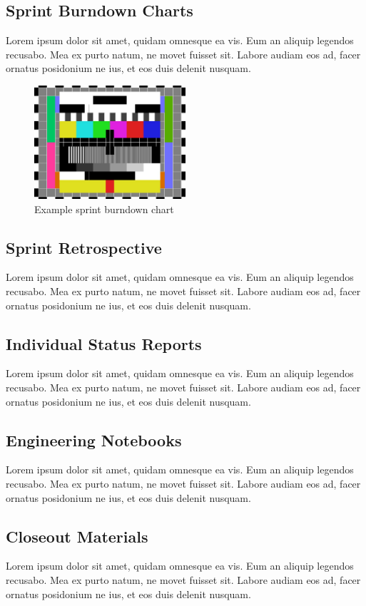 \subsection{Sprint Burndown Charts}
Lorem ipsum dolor sit amet, quidam omnesque ea vis. Eum an aliquip legendos recusabo. Mea ex purto natum, ne movet fuisset sit. Labore audiam eos ad, facer ornatus posidonium ne ius, et eos duis delenit nusquam.

\begin{figure}[h!]
    \centering
    \includegraphics[width=0.5\textwidth]{images/test_image}
    \caption{Example sprint burndown chart}
\end{figure}

\subsection{Sprint Retrospective}
Lorem ipsum dolor sit amet, quidam omnesque ea vis. Eum an aliquip legendos recusabo. Mea ex purto natum, ne movet fuisset sit. Labore audiam eos ad, facer ornatus posidonium ne ius, et eos duis delenit nusquam.

\subsection{Individual Status Reports}
Lorem ipsum dolor sit amet, quidam omnesque ea vis. Eum an aliquip legendos recusabo. Mea ex purto natum, ne movet fuisset sit. Labore audiam eos ad, facer ornatus posidonium ne ius, et eos duis delenit nusquam.

\subsection{Engineering Notebooks}
Lorem ipsum dolor sit amet, quidam omnesque ea vis. Eum an aliquip legendos recusabo. Mea ex purto natum, ne movet fuisset sit. Labore audiam eos ad, facer ornatus posidonium ne ius, et eos duis delenit nusquam.

\subsection{Closeout Materials}
Lorem ipsum dolor sit amet, quidam omnesque ea vis. Eum an aliquip legendos recusabo. Mea ex purto natum, ne movet fuisset sit. Labore audiam eos ad, facer ornatus posidonium ne ius, et eos duis delenit nusquam.

